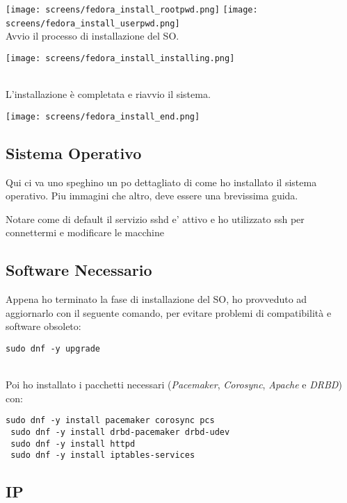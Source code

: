 \texttt{[image: screens/fedora\_install\_rootpwd.png]}
\texttt{[image: screens/fedora\_install\_userpwd.png]}
\ \\
Avvio il processo di installazione del SO.

\begin{center}
	\texttt{[image: screens/fedora\_install\_installing.png]}
\end{center}
\ \\
L'installazione \`{e} completata e riavvio il sistema.

\begin{center}
	\texttt{[image: screens/fedora\_install\_end.png]}
\end{center}

\subsection{Sistema Operativo}

Qui ci va uno speghino un po dettagliato di come ho installato il sistema operativo. Piu immagini che altro, deve essere una brevissima guida.

Notare come di default il servizio sshd e' attivo e ho utilizzato ssh per connettermi e modificare le macchine

\subsection{Software Necessario}

Appena ho terminato la fase di installazione del SO, ho provveduto ad aggiornarlo con il seguente comando, per evitare problemi di compatibilit\`{a} e software obsoleto:

\begin{lstlisting}[style=cmd]
 sudo dnf -y upgrade
\end{lstlisting} 
\ \\
Poi ho installato i pacchetti necessari (\textit{Pacemaker}, \textit{Corosync}, \textit{Apache} e \textit{DRBD}) con: 

\begin{lstlisting}[style=cmd]
 sudo dnf -y install pacemaker corosync pcs
 sudo dnf -y install drbd-pacemaker drbd-udev
 sudo dnf -y install httpd
 sudo dnf -y install iptables-services
\end{lstlisting} 

\subsection{IP}


